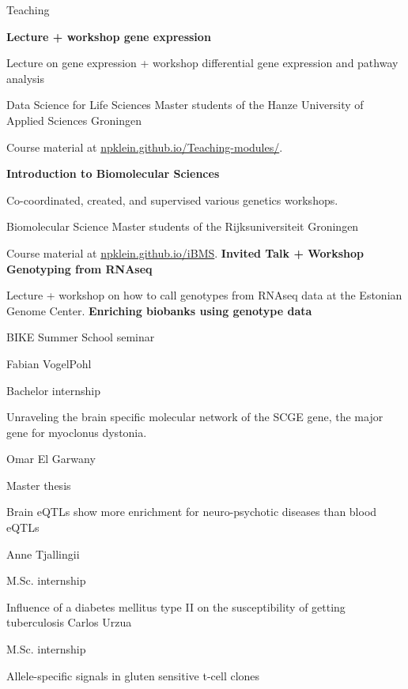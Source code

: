 \begin{rubric}{Teaching}
%
%


\entry*[Sep 2019]%
\textbf{Lecture + workshop gene expression} \par
Lecture on gene expression + workshop differential gene expression and pathway analysis \par
Data Science for Life Sciences Master students of the Hanze University of Applied Sciences Groningen \par
Course material at \url{npklein.github.io/Teaching-modules/}.


%
	\textbf{Introduction to Biomolecular Sciences} \par
	 Co-coordinated, created, and supervised various genetics workshops. \par
	 Biomolecular Science Master students of the Rijksuniversiteit Groningen \par
	 Course material at \url{npklein.github.io/iBMS}.
%
\entry*[26 Aug 2016]%
\textbf{Invited Talk + Workshop Genotyping from RNAseq} \par
Lecture + workshop on how to call genotypes from RNAseq data at the Estonian Genome Center.
%
\entry*[22 Jun 2016]%
\textbf{Enriching biobanks using genotype data} \par
BIKE Summer School seminar
%

\entry*[Apr 2019 -- ]%
Fabian VogelPohl \par
Bachelor internship \par
Unraveling the brain specific molecular network of the SCGE gene, the major gene for myoclonus dystonia. 

%
Omar El Garwany \par
Master thesis \par
Brain eQTLs show more enrichment for neuro-psychotic diseases than blood eQTLs

%
Anne Tjallingii \par
M.Sc. internship \par
Influence of a diabetes mellitus type II on the susceptibility of getting tuberculosis
%
%
Carlos Urzua \par
M.Sc. internship \par
Allele-specific signals in gluten sensitive t-cell clones

\end{rubric}